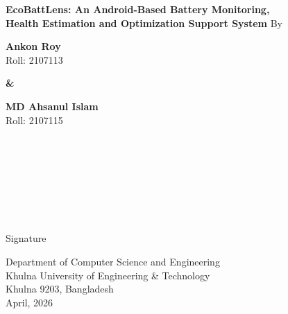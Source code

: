 \documentclass[12pt,a4paper]{report}
\begin{document}
\thispagestyle{plain}
\setcounter{page}{1}
\begin{center}
  {\fontsize{18}{27}\selectfont\bfseries
    EcoBattLens: An Android-Based Battery Monitoring,\\
    Health Estimation and Optimization Support System
  }
  \vspace{3\baselineskip}
  {\fontsize{12}{18}\selectfont By}
  \vspace{2\baselineskip}

  {\fontsize{12}{18}\selectfont\bfseries Ankon Roy}\\
  {\fontsize{12}{18}\selectfont Roll: 2107113}

  \vspace{\baselineskip}
  {\fontsize{12}{18}\selectfont\bfseries \&}
  \vspace{\baselineskip}

  {\fontsize{12}{18}\selectfont\bfseries MD Ahsanul Islam}\\
  {\fontsize{12}{18}\selectfont Roll: 2107115}
\end{center}

\vspace{4\baselineskip}

\\[6pt]
\\
\\
\\
\\
\\
\hfill\underline{\hspace{1.5in}}\\[2pt]
\hfill{\fontsize{12}{18}\selectfont Signature}

\vspace{\fill}
\begin{center}
  {\fontsize{12}{18}\selectfont
    Department of Computer Science and Engineering\\
    Khulna University of Engineering \& Technology\\
    Khulna 9203, Bangladesh\\
  }
  {\fontsize{16}{24}\selectfont April, 2026}
\end{center}
\end{document}
